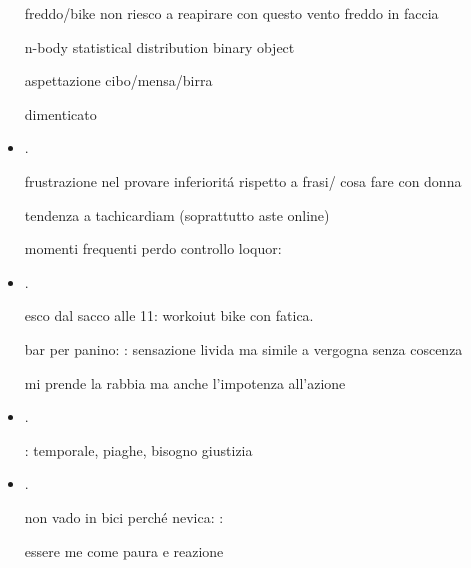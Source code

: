 \begin{itemize}
freddo/bike non riesco a reapirare con questo vento freddo in faccia

n-body statistical distribution binary object

aspettazione cibo/mensa/birra

dimenticato

\item {}.

frustrazione nel provare inferiorit\'a rispetto a frasi/ cosa fare con donna


 

tendenza a tachicardiam (soprattutto aste online)

momenti frequenti perdo controllo loquor: 



\item {}.

esco dal sacco alle 11: workoiut bike con fatica.

bar per panino: : sensazione livida ma simile a vergogna senza coscenza

mi prende la rabbia ma anche l'impotenza all'azione



\item {}.

: temporale, piaghe, bisogno giustizia



\item {}.

non vado in bici perch\'e nevica: : 

essere me come paura e reazione



\end{itemize}
